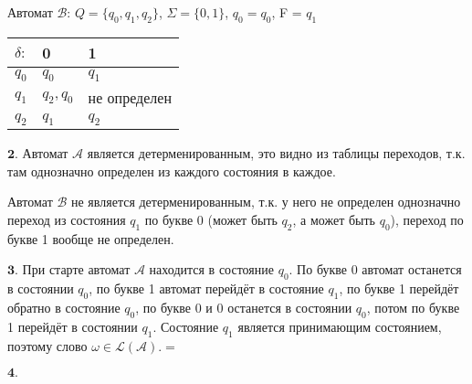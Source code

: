 \documentclass[a4paper,14pt]{article} %
\begin{document}
\vspace{10mm}

Автомат $\mathcal{B}$: $Q = \{q_0, q_1, q_2\}$, $\Sigma = \{0, 1\}$, $q_0 = q_0$, F = $q_1$
\begin{tabular}{ | l | l | l | }
    \hline
    $\delta:$ & 0       & 1             \\ \hline
    $q_0$ & $q_0$       & $q_1$         \\
    $q_1$ & $q_2, q_0$  & не определен  \\
    $q_2$ & $q_1$       & $q_2$         \\
    \hline
    \end{tabular}

\newpage
$\textbf{2.}$ Автомат $\mathcal{A}$ является детерменированным, это видно из таблицы переходов, т.к. там однозначно определен из каждого состояния в каждое.

Автомат $\mathcal{B}$ не является детерменированным, т.к. у него не определен однозначно переход из состояния $q_1$ по букве 0 (может быть $q_2$, а может быть $q_0$), переход по букве 1 вообще не определен.

$\textbf{3.}$ При старте автомат $\mathcal{A}$ находится в состояние $q_0$. По букве 0 автомат останется в состоянии $q_0$, по букве 1 автомат перейдёт в состояние $q_1$, по букве 1 перейдёт обратно в состояние $q_0$,
по букве 0 и 0 останется в состоянии $q_0$, потом по букве 1 перейдёт в состоянии $q_1$. Состояние $q_1$ является принимающим состоянием, поэтому слово $\omega \in \mathcal{L(A)}.=$

$\textbf{4.}$
\end{document}
